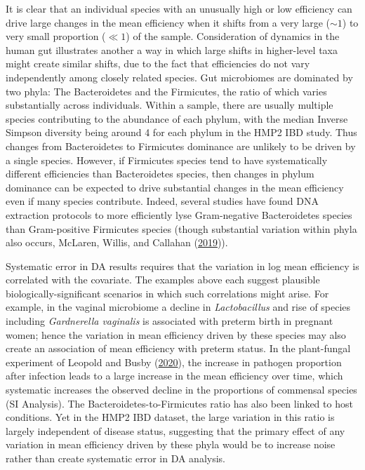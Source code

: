 \documentclass[
]{article}
\begin{document}
It is clear that an individual species with an unusually high or low efficiency can drive large changes in the mean efficiency when it shifts from a very large (\(\sim 1\)) to very small proportion (\(\ll 1\)) of the sample.
Consideration of dynamics in the human gut illustrates another a way in which large shifts in higher-level taxa might create similar shifts, due to the fact that efficiencies do not vary independently among closely related species.
Gut microbiomes are dominated by two phyla: The Bacteroidetes and the Firmicutes, the ratio of which varies substantially across individuals.
Within a sample, there are usually multiple species contributing to the abundance of each phylum, with the median Inverse Simpson diversity being around 4 for each phylum in the HMP2 IBD study.
Thus changes from Bacteroidetes to Firmicutes dominance are unlikely to be driven by a single species.
However, if Firmicutes species tend to have systematically different efficiencies than Bacteroidetes species, then changes in phylum dominance can be expected to drive substantial changes in the mean efficiency even if many species contribute.
Indeed, several studies have found DNA extraction protocols to more efficiently lyse Gram-negative Bacteroidetes species than Gram-positive Firmicutes species (though substantial variation within phyla also occurs, McLaren, Willis, and Callahan (\protect\hyperlink{ref-mclaren2019cons}{2019})).

Systematic error in DA results requires that the variation in log mean efficiency is correlated with the covariate.
The examples above each suggest plausible biologically-significant scenarios in which such correlations might arise.
For example, in the vaginal microbiome a decline in \emph{Lactobacillus} and rise of species including \emph{Gardnerella vaginalis} is associated with preterm birth in pregnant women; hence the variation in mean efficiency driven by these species may also create an association of mean efficiency with preterm status.
In the plant-fungal experiment of Leopold and Busby (\protect\hyperlink{ref-leopold2020host}{2020}), the increase in pathogen proportion after infection leads to a large increase in the mean efficiency over time, which systematic increases the observed decline in the proportions of commensal species (SI Analysis).
The Bacteroidetes-to-Firmicutes ratio has also been linked to host conditions.
Yet in the HMP2 IBD dataset, the large variation in this ratio is largely independent of disease status, suggesting that the primary effect of any variation in mean efficiency driven by these phyla would be to increase noise rather than create systematic error in DA analysis.
\end{document}
